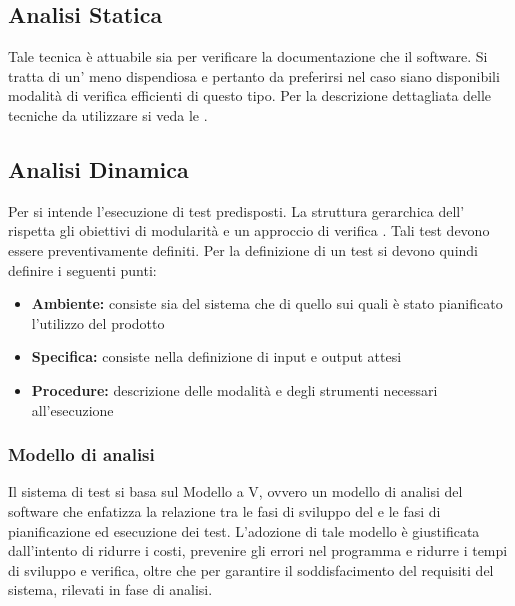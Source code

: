 \documentclass[12pt,a4paper]{article}
\begin{document}
	\subsection{Analisi Statica} 
	Tale tecnica è attuabile sia per verificare la documentazione che il software. Si tratta di un' meno dispendiosa e pertanto da preferirsi nel caso siano disponibili modalità di verifica efficienti di questo tipo. Per la descrizione dettagliata delle tecniche da utilizzare si veda le \NdP.
	
	\subsection{Analisi Dinamica} 
	Per  si intende l'esecuzione di test predisposti. La struttura gerarchica dell' rispetta gli obiettivi di modularità e un approccio di verifica . Tali test devono essere preventivamente definiti. Per la definizione di un test si devono quindi definire i seguenti punti:
	
	\begin{itemize}
		\item \textbf{Ambiente:} consiste sia del sistema  che di quello  sui quali è stato pianificato l'utilizzo del prodotto
		\item \textbf{Specifica:} consiste nella definizione di input e output attesi
		\item \textbf{Procedure:} descrizione delle modalità e degli strumenti necessari all'esecuzione
	\end{itemize}
		
	\subsubsection{Modello di analisi}\label{test_strategia}
		Il sistema di test si basa sul Modello a V, ovvero un modello di analisi del software che enfatizza la relazione tra le fasi di sviluppo del  e le fasi di pianificazione ed esecuzione dei test. L'adozione di tale modello è giustificata dall'intento di ridurre i costi, prevenire gli errori nel programma e ridurre i tempi di sviluppo e verifica, oltre che per garantire il soddisfacimento del requisiti del sistema, rilevati in fase di analisi.
		
\end{document}
